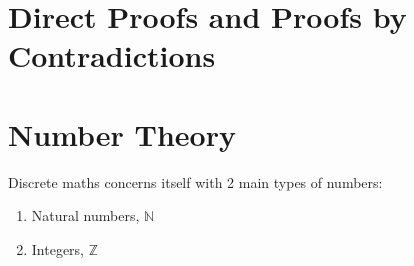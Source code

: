 \section{Direct Proofs and Proofs by Contradictions}
\label{chap:DirectProofsAndProofsByContradictions}

\section{Number Theory}
Discrete maths concerns itself with 2 main types of numbers:
\begin{enumerate}
  \item Natural numbers, $\mathbb{N}$
  \item Integers, $\mathbb{Z}$
\end{enumerate}

